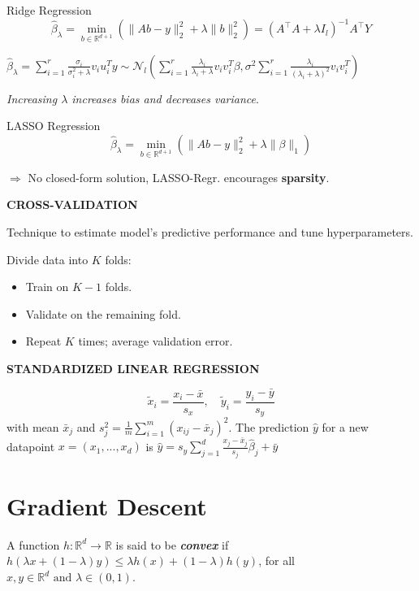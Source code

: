 \documentclass[a4paper,10pt]{article}
\newcommand{\subtitle}[1]{\vspace{0.25cm}\begin{normalsize}\textbf{\textcolor{gray!150}{\uppercase{#1}}}\end{normalsize}}
\begin{document}
\begin{small}
\begin{subbox}{Ridge Regression}
    $$\hat{\beta}_\lambda = \min_{b \in \mathbb{R}^{d+1}} \left( \|A b - y\|_2^2 + \lambda \|b\|_2^2 \right) = (A^\top A + \lambda I_l)^{-1} A^\top Y$$
\end{subbox}

\begin{footnotesize}
$\hat{\beta}_\lambda =  \sum_{i=1}^{r} \frac{\sigma_i}{\sigma_i^2 + \lambda} v_i u_i^T y \sim \mathcal{N}_l \left( \sum_{i=1}^{r} \frac{\lambda_i}{\lambda_i + \lambda} v_i v_i^T \beta, \sigma^2 \sum_{i=1}^{r} \frac{\lambda_i}{(\lambda_i + \lambda)^2} v_i v_i^T \right)$
\end{footnotesize}
\textit{Increasing \( \lambda \) increases bias and decreases variance}. 

\begin{subbox}{LASSO Regression}
\[
\hat{\beta}_\lambda = \min_{b \in \mathbb{R}^{d+1}} \left( \|A b - y\|_2^2 + \lambda \| \beta \|_1 \right)
\]
\end{subbox}
$\Rightarrow$ No closed-form solution, LASSO-Regr. encourages \textbf{sparsity}.

\subtitle{Cross-Validation}

Technique to estimate model's predictive performance and tune hyperparameters.
\begin{subbox_noTitle}
Divide data into \( K \) folds:
\begin{itemize}
    \item Train on \( K-1 \) folds.
    \item Validate on the remaining fold.
    \item Repeat \( K \) times; average validation error.
\end{itemize}
\end{subbox_noTitle}

\subtitle{Standardized Linear Regression} 
\[
\tilde{x}_i = \frac{x_i - \bar{x}}{s_x}, \quad  \tilde{y}_i = \frac{y_i - \bar{y}}{s_y}
\]
with mean \( \bar{x}_j \) and $s_j^2 = \frac{1}{m} \sum_{i=1}^{m} \left( x_{ij} - \bar{x}_j \right)^2$. The prediction $\hat{y}$ for a new datapoint $x=(x_1,...,x_d)$ is $\hat{y} = s_y \sum_{j=1}^{d} \frac{x_j - \bar{x}_j}{s_j} \hat{\beta}_j + \bar{y}$

\section{Gradient Descent}

A function $ h : \mathbb{R}^d \to \mathbb{R}$ is said to be \textbf{\textit{convex}} if $
h(\lambda x + (1 - \lambda) y) \leq \lambda h(x) + (1 - \lambda) h(y)$, for all $ x, y \in \mathbb{R}^d \text{ and } \lambda \in (0,1)$.


\end{small}
\end{document}
